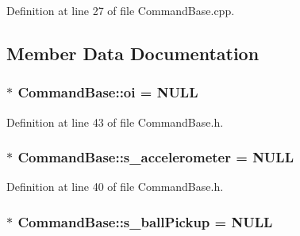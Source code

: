 \-Definition at line 27 of file \-Command\-Base.\-cpp.



\subsection{\-Member \-Data \-Documentation}
\hypertarget{class_command_base_ae6807501159925367f8008fc0534eda5}{
\subsubsection[{oi}]{ $\ast$ {\bf \-Command\-Base\-::oi} = \-N\-U\-L\-L}}\label{class_command_base_ae6807501159925367f8008fc0534eda5}


\-Definition at line 43 of file \-Command\-Base.\-h.

\hypertarget{class_command_base_a2fd849df3b42d41c784179506228e841}{
\subsubsection[{s\-\_\-accelerometer}]{ $\ast$ {\bf \-Command\-Base\-::s\-\_\-accelerometer} = \-N\-U\-L\-L}}\label{class_command_base_a2fd849df3b42d41c784179506228e841}


\-Definition at line 40 of file \-Command\-Base.\-h.

\hypertarget{class_command_base_a06014394e7c262f1ef010dc2fe1b17a9}{
\subsubsection[{s\-\_\-ball\-Pickup}]{ $\ast$ {\bf \-Command\-Base\-::s\-\_\-ball\-Pickup} = \-N\-U\-L\-L}}\label{class_command_base_a06014394e7c262f1ef010dc2fe1b17a9}


